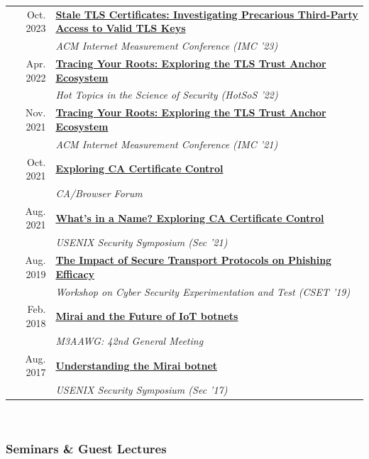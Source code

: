 \documentclass[10pt,singlecolumn]{article} %
\begin{document}
\begin{tabular}{rl}
Oct. 2023 & \textbf{\href{https://zanema.com/slides/imc23_stale_certs.pdf}{Stale TLS Certificates: Investigating Precarious Third-Party Access to Valid TLS Keys}}\\
& \emph{ACM Internet Measurement Conference (IMC '23)} \\
Apr. 2022 & \textbf{\href{https://cps-vo.org/node/82522}{Tracing Your Roots: Exploring the TLS Trust Anchor Ecosystem}}\\
& \emph{Hot Topics in the Science of Security (HotSoS '22)}\\
Nov. 2021 & \textbf{\href{https://zanema.com/videos/imc21-roots.mp4}{Tracing Your Roots: Exploring the TLS Trust Anchor Ecosystem}}\\
& \emph{ACM Internet Measurement Conference (IMC '21)} \\
Oct. 2021 & \textbf{\href{https://zanema.com/slides/cab_forum_ca_transparency.pdf}{Exploring CA Certificate Control}}\\
& \emph{CA/Browser Forum} \\
Aug. 2021 & \textbf{\href{https://www.youtube.com/watch?v=Aq1o8prmoyE}{What's in a Name? Exploring CA Certificate Control}} \\
& \emph{USENIX Security Symposium (Sec '21)} \\
Aug. 2019 & \textbf{\href{https://zanema.com/slides/cset-https-phishing-2019.pdf}{The Impact of Secure Transport Protocols on Phishing Efficacy}} \\
& \emph{Workshop on Cyber Security Experimentation and Test (CSET '19)} \\
Feb. 2018 & \textbf{\href{https://zanema.com/slides/m3aawg_mirai.pdf}{Mirai and the Future of IoT botnets}}\\
& \emph{M3AAWG: 42nd General Meeting} \\ 
Aug. 2017 & \textbf{\href{https://www.youtube.com/watch?v=1pywzRTJDaY}{Understanding the Mirai botnet}} \\
& \emph{USENIX Security Symposium (Sec '17)} \\ 
\end{tabular} \\


\subsubsection*{Seminars \& Guest Lectures}
\end{document}
